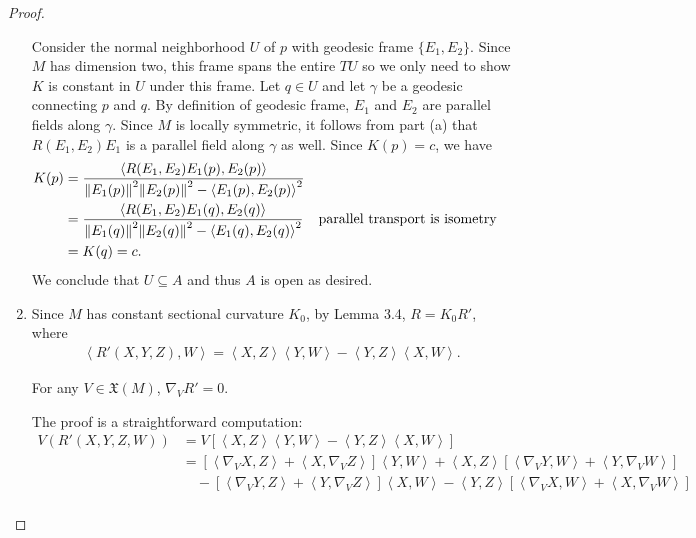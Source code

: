\documentclass[12pt]{article}
\begin{document}
\begin{proof}
\begin{enumerate}[label=(\alph*)]
	Consider the normal neighborhood $ U$ of $p$ with geodesic frame  $ \{E_1,E_2\} $. Since $ M$ has dimension two, this frame spans the entire  $ TU$ so we only need to show $ K$ is constant in  $ U$ under this frame. Let $ q \in U$ and let $ \gamma$ be a geodesic connecting $ p$ and $ q$. By definition of geodesic frame, $ E_1$ and $ E_2$ are parallel fields along $ \gamma$. Since $ M$ is locally symmetric, it follows from part (a) that $ R(E_1,E_2)E_1$ is a parallel field along $ \gamma $ as well. Since $ K(p) = c$, we have
\begin{align*}
	K(p) &=	\frac{\left\langle R(E_1,E_2)E_1(p), E_2(p) \right\rangle}{ {\left\lVert{ E_1(p)}\right\rVert}^2 {\left\lVert{ E_2(p)}\right\rVert}^2 - \left\langle E_1(p),E_2(p) \right\rangle^2   } \\
	     &=	\frac{\left\langle R(E_1,E_2)E_1(q), E_2(q) \right\rangle}{ {\left\lVert{ E_1(q)}\right\rVert}^2 {\left\lVert{ E_2(q)}\right\rVert}^2 - \left\langle E_1(q),E_2(q) \right\rangle^2 } && \text{parallel transport is isometry}  \\
	 &= K(q) = c .
\end{align*}
We conclude that $ U \subseteq A$ and thus $ A$ is open as desired.
\item Since $ M$ has constant sectional curvature $ K_0$, by Lemma 3.4, $ R = K_0 R'$, where
	\begin{align*}
		\left\langle R'(X,Y,Z),W \right\rangle = \left\langle X,Z \right\rangle \left\langle Y,W \right\rangle - \left\langle Y,Z \right\rangle \left\langle X, W\right\rangle.
	\end{align*}
\begin{claim}
For any $ V \in \mathfrak{X}(M)$, $ \nabla_V R' =0$.
\end{claim}
The proof is a straightforward computation:
\begin{align*}
	V(R'(X,Y,Z,W)) &= V[\left\langle X,Z \right\rangle \left\langle Y,W \right\rangle - \left\langle Y,Z \right\rangle \left\langle X,W \right\rangle ] \\
		      &=  \left[ \left\langle \nabla_VX,Z \right\rangle+ \left\langle X, \nabla_VZ \right\rangle \right] \left\langle Y,W \right\rangle + \left\langle X,Z \right\rangle \left[ \left\langle \nabla_VY,W \right\rangle + \left\langle Y,\nabla_VW \right\rangle \right] \\
		      &\quad  - [\left\langle \nabla_VY,Z \right\rangle + \left\langle Y,\nabla_VZ \right\rangle] \left\langle X,W \right\rangle - \left\langle Y,Z \right\rangle [\left\langle \nabla_VX,W \right\rangle + \left\langle X,\nabla_VW \right\rangle]  \\

\end{align*}
\end{enumerate}
\end{proof}
\end{document}

